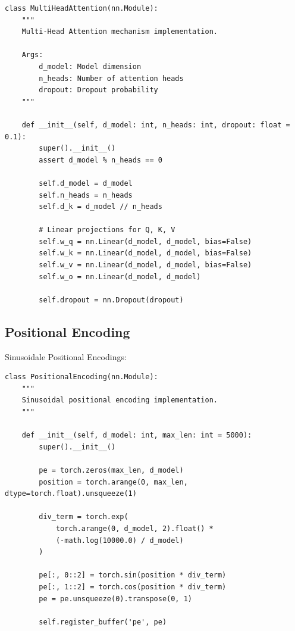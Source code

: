 \begin{lstlisting}[style=pythonstyle, caption=Multi-Head Attention Klasse]
class MultiHeadAttention(nn.Module):
    """
    Multi-Head Attention mechanism implementation.
    
    Args:
        d_model: Model dimension
        n_heads: Number of attention heads
        dropout: Dropout probability
    """
    
    def __init__(self, d_model: int, n_heads: int, dropout: float = 0.1):
        super().__init__()
        assert d_model % n_heads == 0
        
        self.d_model = d_model
        self.n_heads = n_heads
        self.d_k = d_model // n_heads
        
        # Linear projections for Q, K, V
        self.w_q = nn.Linear(d_model, d_model, bias=False)
        self.w_k = nn.Linear(d_model, d_model, bias=False)
        self.w_v = nn.Linear(d_model, d_model, bias=False)
        self.w_o = nn.Linear(d_model, d_model)
        
        self.dropout = nn.Dropout(dropout)
\end{lstlisting}

\subsection{Positional Encoding}

Sinusoidale Positional Encodings:

\begin{lstlisting}[style=pythonstyle, caption=Positional Encoding Implementation]
class PositionalEncoding(nn.Module):
    """
    Sinusoidal positional encoding implementation.
    """
    
    def __init__(self, d_model: int, max_len: int = 5000):
        super().__init__()
        
        pe = torch.zeros(max_len, d_model)
        position = torch.arange(0, max_len, dtype=torch.float).unsqueeze(1)
        
        div_term = torch.exp(
            torch.arange(0, d_model, 2).float() * 
            (-math.log(10000.0) / d_model)
        )
        
        pe[:, 0::2] = torch.sin(position * div_term)
        pe[:, 1::2] = torch.cos(position * div_term)
        pe = pe.unsqueeze(0).transpose(0, 1)
        
        self.register_buffer('pe', pe)
\end{lstlisting}

